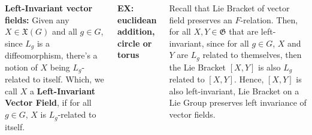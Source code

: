 \documentclass[20pt,,margin=1in,innermargin=-4.5in,blockverticalspace=-0.25in]{tikzposter}
\begin{document}
\begin{columns}
{        \hfil

        \textbf{Left-Invariant vector fields:} Given any $X\in\mathfrak{X}(G)$ and all $g\in G$, since $L_g$ is a diffeomorphism, there's a notion of $X$ being $L_g$-related to itself. Which, we call $X$ a \textbf{Left-Invariant Vector Field}, if for all $g\in G$, $X$ is $L_g$-related to itself.

        \textbf{EX: euclidean addition, circle or torus}

        \hfil

        Recall that Lie Bracket of vector field preserves an $F$-relation. Then, for all $X,Y\in\mathfrak{G}$ that are left-invariant, since for all $g\in G$, $X$ and $Y$ are $L_g$ related to themselves, then the Lie Bracket $[X,Y]$ is also $L_g$ related to $[X,Y]$. Hence, $[X,Y]$ is also left-invariant, Lie Bracket on a Lie Group preserves left invariance of vector fields.
    }


    
    
\end{columns}
\end{document}
